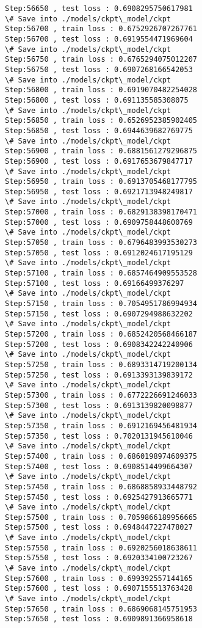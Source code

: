 \documentclass[11pt]{article}
\begin{document}
\begin{Verbatim}[commandchars=\\\{\}]
Step:56650 , test loss : 0.6908295750617981
\# Save into ./models/ckpt\_model/ckpt
Step:56700 , train loss : 0.6752926707267761
Step:56700 , test loss : 0.6919554471969604
\# Save into ./models/ckpt\_model/ckpt
Step:56750 , train loss : 0.6765294075012207
Step:56750 , test loss : 0.6907268166542053
\# Save into ./models/ckpt\_model/ckpt
Step:56800 , train loss : 0.6919070482254028
Step:56800 , test loss : 0.691135585308075
\# Save into ./models/ckpt\_model/ckpt
Step:56850 , train loss : 0.6526952385902405
Step:56850 , test loss : 0.6944639682769775
\# Save into ./models/ckpt\_model/ckpt
Step:56900 , train loss : 0.6881561279296875
Step:56900 , test loss : 0.6917653679847717
\# Save into ./models/ckpt\_model/ckpt
Step:56950 , train loss : 0.6913705468177795
Step:56950 , test loss : 0.6921713948249817
\# Save into ./models/ckpt\_model/ckpt
Step:57000 , train loss : 0.6829138398170471
Step:57000 , test loss : 0.6909758448600769
\# Save into ./models/ckpt\_model/ckpt
Step:57050 , train loss : 0.6796483993530273
Step:57050 , test loss : 0.6912024617195129
\# Save into ./models/ckpt\_model/ckpt
Step:57100 , train loss : 0.6857464909553528
Step:57100 , test loss : 0.69166499376297
\# Save into ./models/ckpt\_model/ckpt
Step:57150 , train loss : 0.7054951786994934
Step:57150 , test loss : 0.6907294988632202
\# Save into ./models/ckpt\_model/ckpt
Step:57200 , train loss : 0.6852420568466187
Step:57200 , test loss : 0.6908342242240906
\# Save into ./models/ckpt\_model/ckpt
Step:57250 , train loss : 0.6893314719200134
Step:57250 , test loss : 0.6913393139839172
\# Save into ./models/ckpt\_model/ckpt
Step:57300 , train loss : 0.6772226691246033
Step:57300 , test loss : 0.6913139820098877
\# Save into ./models/ckpt\_model/ckpt
Step:57350 , train loss : 0.6912169456481934
Step:57350 , test loss : 0.7020131945610046
\# Save into ./models/ckpt\_model/ckpt
Step:57400 , train loss : 0.6860198974609375
Step:57400 , test loss : 0.6908514499664307
\# Save into ./models/ckpt\_model/ckpt
Step:57450 , train loss : 0.6868858933448792
Step:57450 , test loss : 0.6925427913665771
\# Save into ./models/ckpt\_model/ckpt
Step:57500 , train loss : 0.7059866189956665
Step:57500 , test loss : 0.6948447227478027
\# Save into ./models/ckpt\_model/ckpt
Step:57550 , train loss : 0.6920256018638611
Step:57550 , test loss : 0.6920334100723267
\# Save into ./models/ckpt\_model/ckpt
Step:57600 , train loss : 0.699392557144165
Step:57600 , test loss : 0.6907155513763428
\# Save into ./models/ckpt\_model/ckpt
Step:57650 , train loss : 0.6869068145751953
Step:57650 , test loss : 0.6909891366958618

\end{Verbatim}
\end{document}
